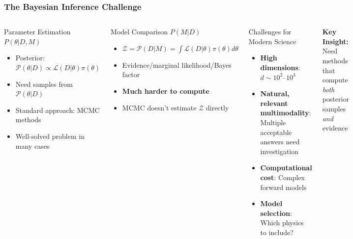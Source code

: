 \documentclass[aspectratio=169]{beamer}
\begin{document}
\begin{frame}
    \frametitle{The Bayesian Inference Challenge}
    \begin{columns}
        \begin{block}{Parameter Estimation $P(\theta|D,M)$}
            \begin{itemize}
                \item Posterior: $\mathcal{P}(\theta|D) \propto \mathcal{L}(D|\theta) \pi(\theta)$
                \item Need samples from $\mathcal{P}(\theta|D)$
                \item Standard approach: MCMC methods
                \item Well-solved problem in many cases
            \end{itemize}
        \end{block}
        \begin{block}{Model Comparison $P(M|D)$}
            \begin{itemize}
                \item $\mathcal{Z} = \mathcal{P}(D|M) = \int \mathcal{L}(D|\theta) \pi(\theta) d\theta$
                \item Evidence/marginal likelihood/Bayes factor
                \item \textbf{Much harder to compute}
                \item MCMC doesn't estimate $\mathcal{Z}$ directly
            \end{itemize}
        \end{block}
        \begin{block}{Challenges for Modern Science}
            \begin{itemize}
                \item \textbf{High dimensions}: $d \sim 10^2$--$10^3$
                \item \textbf{Natural, relevant multimodality}: Multiple acceptable answers need investigation
                \item \textbf{Computational cost}: Complex forward models
                \item \textbf{Model selection}: Which physics to include?
            \end{itemize}
        \end{block}
        \begin{center}
            \textbf{Key Insight:}\\
            Need methods that compute \emph{both} \\
            posterior samples \emph{and} evidence
        \end{center}
    \end{columns}
\end{frame}
\end{document}
